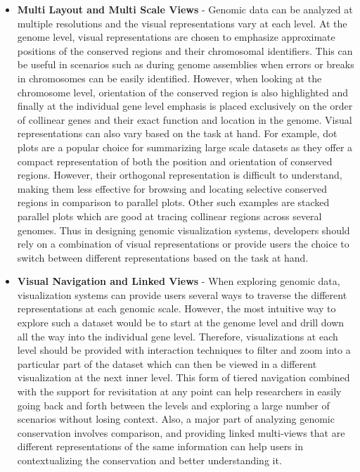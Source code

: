 \begin{itemize}
    \item \textbf{Multi Layout and Multi Scale Views} - 
    Genomic data can be analyzed at multiple resolutions and the visual representations vary at each level. At the genome level, visual representations are chosen to emphasize approximate positions of the conserved regions and their chromosomal identifiers. This can be useful in scenarios such as during genome assemblies when errors or breaks in chromosomes can be easily identified. However, when looking at the chromosome level, orientation of the conserved region is also highlighted and finally at the individual gene level emphasis is placed exclusively on the order of collinear genes and their exact function and location in the genome. Visual representations can also vary based on the task at hand. For example, dot plots are a popular choice for summarizing large scale datasets as they offer a compact representation of both the position and orientation of conserved regions. However, their orthogonal representation is difficult to understand, making them less effective for browsing and locating selective conserved regions in comparison to parallel plots. Other such examples are stacked parallel plots which are good at tracing collinear regions across several genomes. Thus in designing genomic visualization systems, developers should rely on a combination of visual representations or provide users the choice to switch between different representations based on the task at hand. 

    \item \textbf{Visual Navigation and Linked Views} - When exploring genomic data, visualization systems can provide users several ways to traverse the different representations at each genomic scale. However, the most intuitive way to explore such a dataset would be to start at the genome level and drill down all the way into the individual gene level. Therefore, visualizations at each level should be provided with interaction techniques to filter and zoom into a particular part of the dataset which can then be viewed in a different visualization at the next inner level. This form of tiered navigation combined with the support for revisitation at any point can help researchers in easily going back and forth between the levels and exploring a large number of scenarios without losing context. Also, a major part of analyzing genomic conservation involves comparison, and providing linked multi-views that are different representations of the same information can help users in contextualizing the conservation and better understanding it.
    

\end{itemize}
